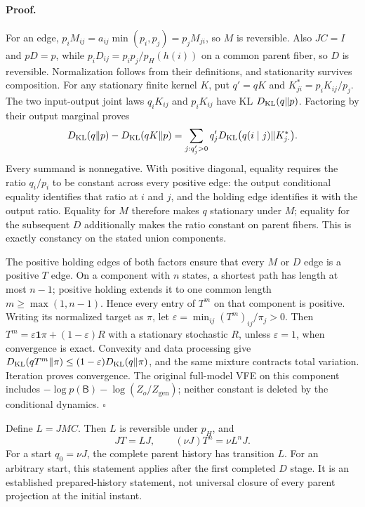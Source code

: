 \paragraph{Proof.}
For an edge, \(p_iM_{ij}=a_{ij}\min(p_i,p_j)=p_jM_{ji}\), so \(M\)
is reversible. Also \(JC=I\) and \(pD=p\), while
\(p_iD_{ij}=p_ip_j/p_H(h(i))\) on a common parent fiber, so \(D\) is
reversible. Normalization follows from their definitions, and stationarity
survives composition. For any stationary finite kernel \(K\), put
\(q'=qK\) and \(K^*_{ji}=p_iK_{ij}/p_j\). The two input-output joint
laws \(q_iK_{ij}\) and \(p_iK_{ij}\) have KL \(D_{\mathrm{KL}}(q\Vert p)\).
Factoring by their output marginal proves
\begin{equation}
 D_{\mathrm{KL}}(q\Vert p)-D_{\mathrm{KL}}(qK\Vert p)
 =\sum_{j:q'_j>0}q'_j
   D_{\mathrm{KL}}\bigl(q(i\mid j)\Vert K^*_{j\cdot}\bigr).
\label{eq:rg-memory-reverse-conditional-loss}
\end{equation}
Every summand is nonnegative. With positive diagonal, equality requires the
ratio \(q_i/p_i\) to be constant across every positive edge: the output
conditional equality identifies that ratio at \(i\) and \(j\), and the
holding edge identifies it with the output ratio. Equality for \(M\)
therefore makes \(q\) stationary under \(M\); equality for the subsequent
\(D\) additionally makes the ratio constant on parent fibers. This is
exactly constancy on the stated union components.

The positive holding edges of both factors ensure that every \(M\) or
\(D\) edge is a positive \(T\) edge. On a component with \(n\) states,
a shortest path has length at most \(n-1\); positive holding extends it to
one common length \(m\geq\max(1,n-1)\). Hence every entry of
\(T^m\) on that component is positive. Writing its normalized target as
\(\pi\), let \(\varepsilon=\min_{ij}(T^m)_{ij}/\pi_j>0\).
Then \(T^m=\varepsilon\mathbf1\pi+(1-\varepsilon)R\) with a
stationary stochastic \(R\), unless \(\varepsilon=1\), when convergence
is exact. Convexity and data processing give
\(D_{\mathrm{KL}}(qT^m\Vert\pi)\leq(1-\varepsilon)D_{\mathrm{KL}}(q\Vert\pi)\), and
the same mixture contracts total variation. Iteration proves convergence.
The original full-model VFE on this component includes
\(-\log p(\mathsf B)-\log(Z_o/Z_{\mathrm{gen}})\); neither constant
is deleted by the conditional dynamics. \(\square\)

Define \(L=JMC\). Then \(L\) is reversible under \(p_H\), and
\begin{equation}
 JT=LJ,\qquad (\nu J)T^n=\nu L^nJ.
\label{eq:rg-memory-parent-semiconjugacy}
\end{equation}
For a start \(q_0=\nu J\), the complete parent history has transition
\(L\). For an arbitrary start, this statement applies after the first
completed \(D\) stage. It is an established prepared-history statement,
not universal closure of every parent projection at the initial instant.

